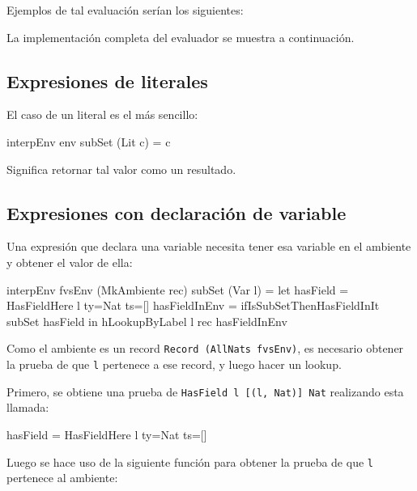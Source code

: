 Ejemplos de tal evaluación serían los siguientes:


La implementación completa del evaluador se muestra a continuación.

\subsection{Expresiones de literales}

El caso de un literal es el más sencillo:

\begin{code}
interpEnv env subSet (Lit c) = c
\end{code}

Significa retornar tal valor como un resultado.

\subsection{Expresiones con declaración de variable}

Una expresión que declara una variable necesita tener esa variable en el ambiente y obtener el valor de ella:

\begin{code}
interpEnv {fvsEnv} (MkAmbiente rec) subSet (Var l) =
  let hasField = HasFieldHere {l} {ty=Nat} {ts=[]}
    hasFieldInEnv = ifIsSubSetThenHasFieldInIt subSet hasField
  in hLookupByLabel l rec hasFieldInEnv
\end{code}

Como el ambiente es un record \texttt{Record (AllNats fvsEnv)}, es necesario obtener la prueba de que \texttt{l} pertenece a ese record, y luego hacer un lookup.

Primero, se obtiene una prueba de \texttt{HasField l [(l, Nat)] Nat} realizando esta llamada:

\begin{code}
hasField = HasFieldHere {l} {ty=Nat} {ts=[]}
\end{code}

Luego se hace uso de la siguiente función para obtener la prueba de que \texttt{l} pertenece al ambiente:

